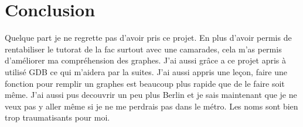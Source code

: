 \section{Conclusion}

Quelque part je ne regrette pas d'avoir pris ce projet.
En plus d'avoir permis de rentabiliser le tutorat de la fac surtout avec une camarades, cela m'as permis d'améliorer ma compréhension des graphes. J'ai aussi grâce a ce projet apris à utilisé GDB ce qui m'aidera par la suites. J'ai aussi appris une leçon, faire une fonction pour remplir un graphes est beaucoup plus rapide que de le faire soit même. J'ai aussi pus decouvrir un peu plus Berlin et je sais maintenant que je ne veux pas y aller même si je ne me perdrais pas dans le métro. Les noms sont bien trop traumatisants pour moi.
